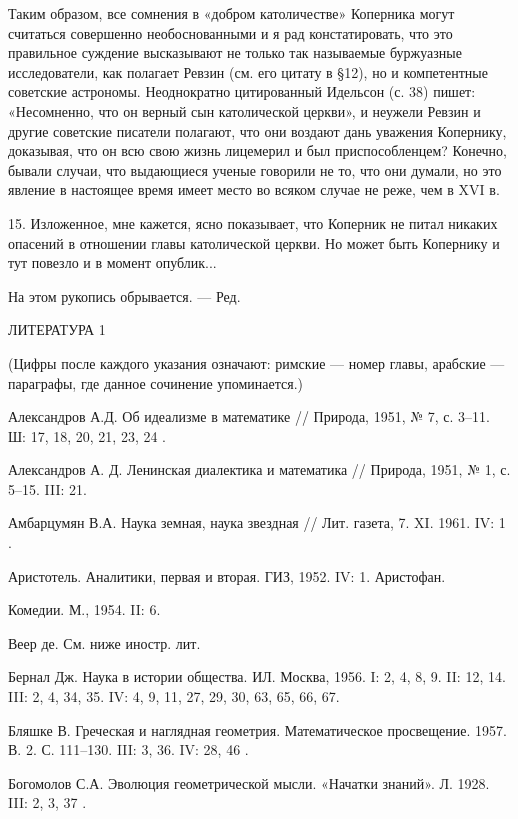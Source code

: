 Таким образом,  все сомнения  в «добром католичестве»  Коперника могут
считаться совершенно  необоснованными и я рад  констатировать, что это
правильное суждение  высказывают не  только так  называемые буржуазные
исследователи,  как полагает  Ревзин  (см.  его цитату  в  §12), но  и
компетентные советские  астрономы. Неоднократно  цитированный Идельсон
(с. 38) пишет: «Несомненно, что  он верный сын католической церкви», и
неужели Ревзин и  другие советские писатели полагают,  что они воздают
дань уважения Копернику, доказывая, что  он всю свою жизнь лицемерил и
был  приспособленцем? Конечно,  бывали случаи,  что выдающиеся  ученые
говорили не то, что они думали, но это явление в настоящее время имеет
место во всяком случае не реже, чем в XVI в.

15. Изложенное,  мне кажется, ясно  показывает, что Коперник  не питал
никаких опасений в отношении главы  католической церкви. Но может быть
Копернику и тут повезло и в момент опублик...

На этом рукопись обрывается. --- Ред.

ЛИТЕРАТУРА 1

(Цифры  после  каждого указания  означают:  римские  --- номер  главы,
арабские --- параграфы, где данное сочинение упоминается.)

Александров А.Д. Об  идеализме в математике // Природа, 1951,  № 7, с.
3--11. Ш: 17, 18, 20, 21, 23, 24                                     .

Александров А. Д. Ленинская диалектика  и математика // Природа, 1951,
№ 1, с. 5--15. III: 21.

Амбарцумян В.А.  Наука земная, наука  звездная // Лит. газета,  7. XI.
1961. IV: 1                                                          .

Аристотель. Аналитики, первая и вторая. ГИЗ, 1952. IV: 1. Аристофан.

Комедии. М., 1954. II: 6.

Веер де. См. ниже иностр. лит.

Бернал Дж. Наука в истории общества. ИЛ.  Москва, 1956. I: 2, 4, 8, 9.
II: 12, 14. III: 2,  4, 34, 35. IV: 4, 9, 11, 27,  29, 30, 63, 65, 66,
67.

Бляшке В. Греческая и наглядная геометрия. Математическое просвещение.
1957. В. 2. С. 111--130. III: 3, 36. IV: 28, 46                      .

Богомолов  С.А. Эволюция  геометрической мысли.  «Начатки знаний».  Л.
1928. III: 2, 3, 37                                                  .

